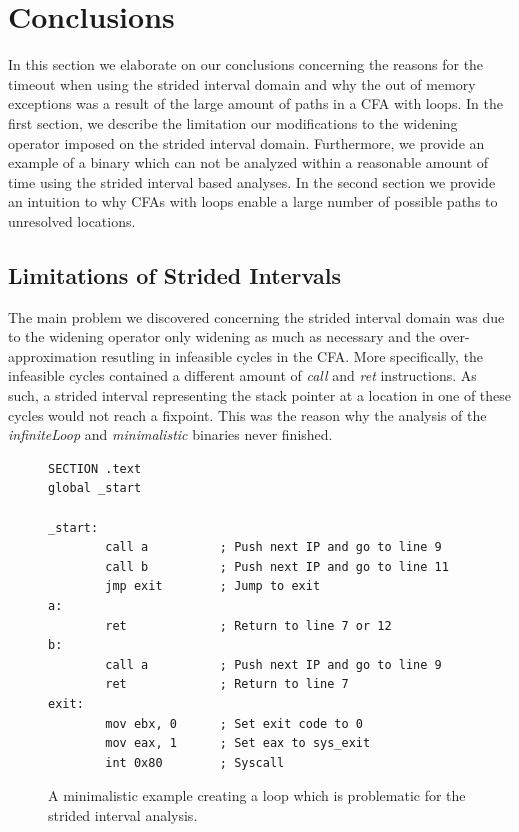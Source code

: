 \documentclass{kththesis}
\renewcommand{\it}[1]{\textit{#1}}
\begin{document}
\section{Conclusions}\label{sec:conclusions}
In this section we elaborate on our conclusions concerning the reasons for the timeout when using the strided interval domain and why the out of memory exceptions was a result of the large amount of paths in a CFA with loops. In the first section, we describe the limitation our modifications to the widening operator imposed on the strided interval domain. Furthermore, we provide an example of a binary which can not be analyzed within a reasonable amount of time using the strided interval based analyses. In the second section we provide an intuition to why CFAs with loops enable a large number of possible paths to unresolved locations. 
\subsection{Limitations of Strided Intervals}\label{sec:nonZeroSum}
The main problem we discovered concerning the strided interval domain was due to the widening operator only widening as much as necessary and the over-approximation resutling in infeasible cycles in the CFA. More specifically, the infeasible cycles contained a different amount of \it{call} and \it{ret} instructions. As such, a strided interval representing the stack pointer at a location in one of these cycles would not reach a fixpoint. This was the reason why the analysis of the \it{infiniteLoop} and \it{minimalistic} binaries never finished.
\begin{figure}[!t]
    \centering
\begin{tcolorbox}
\begin{verbatim}
SECTION .text
global _start

_start:
        call a          ; Push next IP and go to line 9
        call b          ; Push next IP and go to line 11
        jmp exit        ; Jump to exit
a:            
        ret             ; Return to line 7 or 12
b: 
        call a          ; Push next IP and go to line 9
        ret             ; Return to line 7
exit:
        mov ebx, 0      ; Set exit code to 0
        mov eax, 1      ; Set eax to sys_exit
        int 0x80        ; Syscall
\end{verbatim}
\end{tcolorbox}
\caption{A minimalistic example creating a loop which is problematic for the strided interval analysis.}
    \label{fig:badLoop}
\end{figure}
\end{document}
